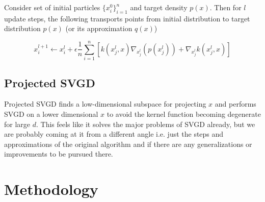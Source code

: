\documentclass[12pt]{article}
\renewcommand{\[}{\left[}
\renewcommand{\]}{\right]}
\renewcommand{\(}{\left(}
\renewcommand{\)}{\right)}
\begin{document}
Consider set of initial particles $\{x_i^0\}_{i=1}^n$ and target density $p(x)$. Then for $l$ update steps, the following transports points from initial distribution to target distribution $p(x)$ (or its approximation $q(x)$)

$$x_i^{l+1} \leftarrow x_i^{l} + \epsilon \frac{1}{n}\sum_{i=1}^{n}\left[k(x_j^l, x) \nabla_{x_j^l}(p(x_j^l)) + \nabla_{x_j^l}k(x_j^l, x)\right]$$




\subsection{Projected SVGD}
\citep{chen_projected_2020} Projected SVGD finds a low-dimensional subspace for projecting $x$ and performs SVGD on a lower dimensional $x$ to avoid the kernel function becoming degenerate for large $d$. This feels like it solves the major problems of SVGD already, but we are probably coming at it from a different angle i.e. just the steps and approximations of the original algorithm and if there are any generalizations or improvements to be pursued there.

\section{Methodology}
\end{document}

